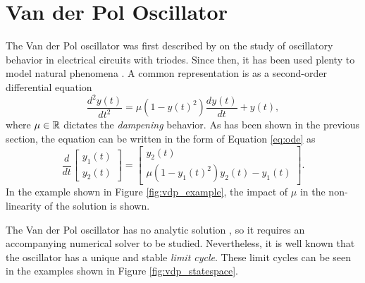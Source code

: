 \section{Van der Pol Oscillator}\label{sec:vdp}

The Van der Pol oscillator was first described by \textcite{van_der_pol_theory_1920} on the study of oscillatory behavior in electrical circuits with triodes.
Since then, it has been used plenty to model natural phenomena \cite{lucero_modeling_2013,fitzhugh_impulses_1961,nagumo_active_1962,cartwright_dynamics_1999}.
A common representation is as a second-order differential equation \[
    \frac{d^2 y(t)}{dt^2} = \mu\left( 1-y(t)^2 \right) \frac{d y(t)}{dt} + y(t)
,\] 
where $\mu\in \mathbb{R}$ dictates the \emph{dampening} behavior. 
As has been shown in the previous section, the equation can be written in the form of Equation \eqref{eq:ode} as
\begin{equation}\label{eq:vdp}
    \frac{d}{dt}\begin{bmatrix} y_1\left( t \right) \\ y_2\left( t \right)  \end{bmatrix} = \begin{bmatrix} 
y_2\left( t \right) \\
\mu\left( 1-y_1\left( t \right) ^2 \right) y_2\left( t \right) - y_1(t)
\end{bmatrix} 
.\end{equation}
In the example shown in Figure \ref{fig:vdp_example}, the impact of $\mu$ in the non-linearity of the solution is shown.

The Van der Pol oscillator has no analytic solution \cite{panayotounakos_lack_2003}, so it requires an accompanying numerical solver to be studied.
Nevertheless, it is well known that the oscillator has a unique and stable \emph{limit cycle}\footnotemark \cite{grimshaw_nonlinear_1993}. 
These limit cycles can be seen in the examples shown in Figure \ref{fig:vdp_statespace}.

